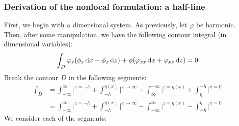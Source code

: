 \documentclass[10pt,reqno,oneside,a4paper]{article}
\begin{document}
\subsubsection{Derivation of the nonlocal formulation: a half-line}
First, we begin with a dimensional system. As previously, let $\varphi$ be harmonic. Then, after some manipulation, we have the following contour integral (in dimensional variables):
\begin{equation}
\int_D \varphi_z(\phi_z \,\mathrm{d} x - \phi_x \,\mathrm{d} z) + \phi(\varphi_{xx} \,\mathrm{d} x + \varphi_{xz} \,\mathrm{d} z) = 0
\end{equation}
Break the contour $D$ in the following segments:
\begin{align*}
\int_D &= \int_{-\infty}^{\infty} \bigg|^{z=-h} + \int^{\eta(x)}_{-h} \bigg|^{x \to \infty} + \int^{-\infty}_{\infty} \bigg|^{z= \eta(x)} + \int_{\eta}^{-h} \bigg|^{x=0} \\
&= \int_{-\infty}^{\infty} \bigg|^{z=-h} + \int^{\eta(x)}_{-h} \bigg|^{x \to \infty} - \int^{\infty}_{-\infty} \bigg|^{z= \eta(x)} - \int^{\eta}_{-h} \bigg|^{x=0}
\end{align*}
We consider each of the segments:
\end{document}
